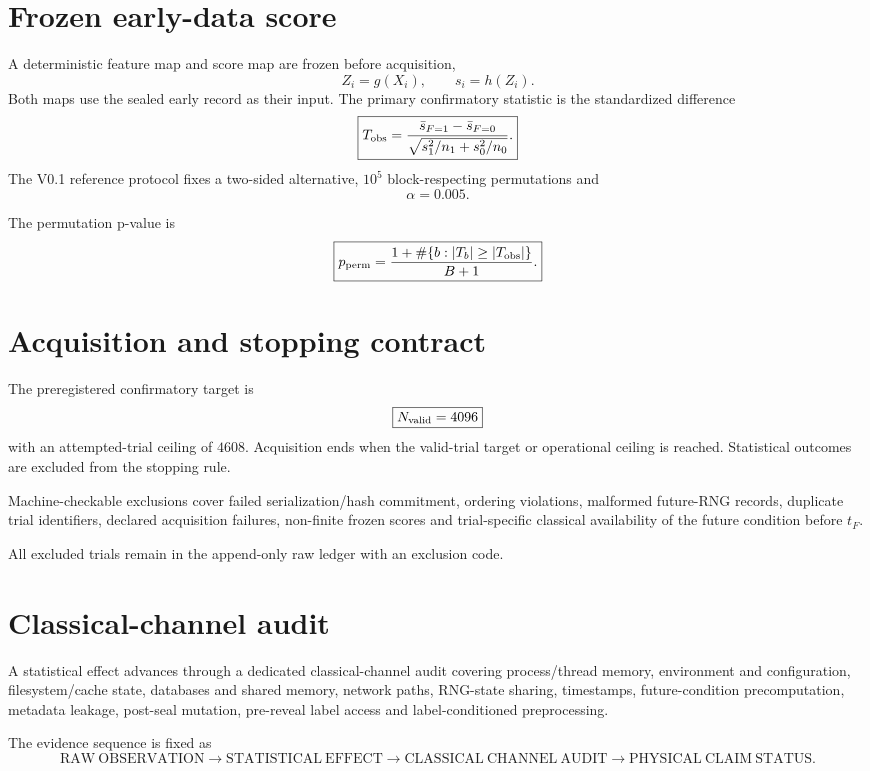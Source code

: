 \documentclass[11pt]{book}
\begin{document}
\section{Frozen early-data score}

A deterministic feature map and score map are frozen before acquisition,
\[
Z_i=g(X_i),
\qquad
s_i=h(Z_i).
\]
Both maps use the sealed early record as their input. The primary confirmatory statistic is the standardized difference
\[
\boxed{
T_{\rm obs}
=\frac{\bar s_{F=1}-\bar s_{F=0}}
{\sqrt{s_1^2/n_1+s_0^2/n_0}}.
}
\]
The V0.1 reference protocol fixes a two-sided alternative, $10^5$ block-respecting permutations and
\[
\boxed{\alpha=0.005.}
\]

The permutation p-value is
\[
\boxed{
p_{\rm perm}
=\frac{1+\#\{b:|T_b|\ge |T_{\rm obs}|\}}
{B+1}.
}
\]

\section{Acquisition and stopping contract}

The preregistered confirmatory target is
\[
\boxed{N_{\rm valid}=4096}
\]
with an attempted-trial ceiling of $4608$. Acquisition ends when the valid-trial target or operational ceiling is reached. Statistical outcomes are excluded from the stopping rule.

Machine-checkable exclusions cover failed serialization/hash commitment, ordering violations, malformed future-RNG records, duplicate trial identifiers, declared acquisition failures, non-finite frozen scores and trial-specific classical availability of the future condition before $t_F$.

All excluded trials remain in the append-only raw ledger with an exclusion code.

\section{Classical-channel audit}

A statistical effect advances through a dedicated classical-channel audit covering process/thread memory, environment and configuration, filesystem/cache state, databases and shared memory, network paths, RNG-state sharing, timestamps, future-condition precomputation, metadata leakage, post-seal mutation, pre-reveal label access and label-conditioned preprocessing.

The evidence sequence is fixed as
\[
\boxed{
\mathrm{RAW\ OBSERVATION}
\to
\mathrm{STATISTICAL\ EFFECT}
\to
\mathrm{CLASSICAL\ CHANNEL\ AUDIT}
\to
\mathrm{PHYSICAL\ CLAIM\ STATUS}.
}
\]
\end{document}
